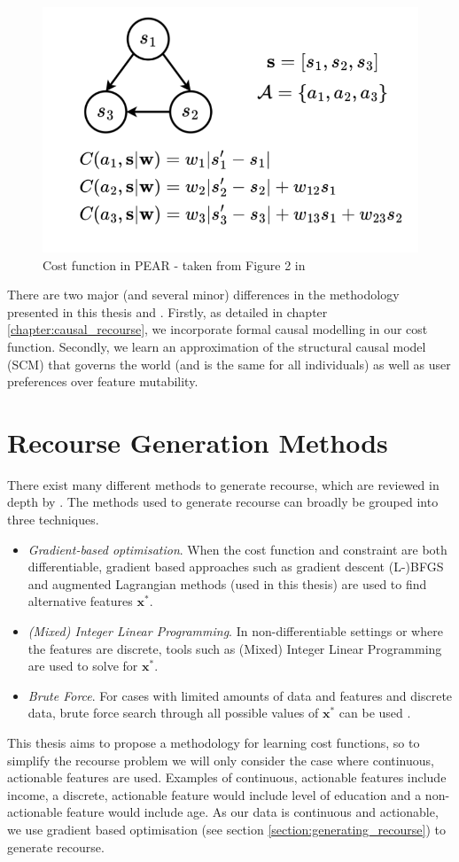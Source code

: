 \begin{figure}[!htb]
	\centering
	\includegraphics[width=0.5\linewidth]{images/detoni_et_al2.png}
	\caption{Cost function in PEAR - taken from Figure 2 in \textcite{detoniPersonalizedAlgorithmicRecourse2023}}
	\label{fig:detoni_et_al2}
\end{figure}
\bigskip
There are two major (and several minor) differences in the methodology presented in this thesis and \textcite{detoniPersonalizedAlgorithmicRecourse2023}. Firstly, as detailed in chapter \ref{chapter:causal_recourse}, we incorporate formal causal modelling \citep{pearl2016causal} in our cost function. Secondly, we learn an approximation of the structural causal model (SCM) that governs the world (and is the same for all individuals) as well as user preferences over feature mutability.


\section{Recourse Generation Methods}

There exist many different methods to generate recourse, which are reviewed in depth by \textcite{karimiSurveyAlgorithmicRecourse2022}. The methods used to generate recourse can broadly be grouped into three techniques.\\

\begin{itemize}
	\item \textit{Gradient-based optimisation}. When the cost function and constraint are both differentiable, gradient based approaches such as gradient descent (L-)BFGS and augmented Lagrangian methods (used in this thesis) are used to find alternative features $\mathbf{x}^*$.
	\item \textit{(Mixed) Integer Linear Programming}. In non-differentiable settings or where the features are discrete, tools such as (Mixed) Integer Linear Programming are used to solve for $\mathbf{x}^*$.
	\item \textit{Brute Force}. For cases with limited amounts of data and features and discrete data, brute force search through all possible values of $\mathbf{x}^*$ can be used \citep{vonkugelgenFairnessCausalAlgorithmic2022}.
\end{itemize}
\bigskip
This thesis aims to propose a methodology for learning cost functions, so to simplify the recourse problem we will only consider the case where continuous, actionable features are used. Examples of continuous, actionable features include income, a discrete, actionable feature would include level of education and a non-actionable feature would include age. As our data is continuous and actionable, we use gradient based optimisation (see section \ref{section:generating_recourse}) to generate recourse.